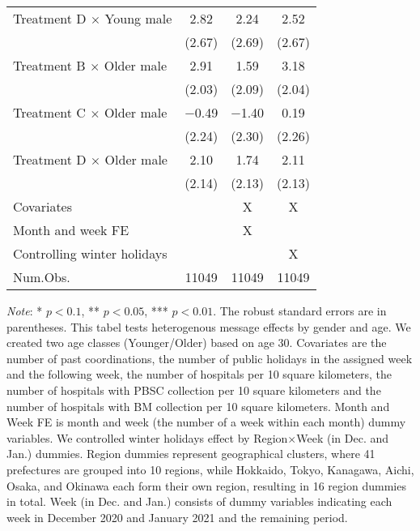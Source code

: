 \documentclass[12pt, a4paper]{article}
\begin{document}
\begin{table}[H]
\begin{threeparttable}
\begin{tabular}[t]{lccc}
Treatment D $\times$ Young male & \num{2.82} & \num{2.24} & \num{2.52}\\
 & (\num{2.67}) & (\num{2.69}) & (\num{2.67})\\
Treatment B $\times$ Older male & \num{2.91} & \num{1.59} & \num{3.18}\\
 & (\num{2.03}) & (\num{2.09}) & (\num{2.04})\\
Treatment C $\times$ Older male & \num{-0.49} & \num{-1.40} & \num{0.19}\\
 & (\num{2.24}) & (\num{2.30}) & (\num{2.26})\\
Treatment D $\times$ Older male & \num{2.10} & \num{1.74} & \num{2.11}\\
 & (\num{2.14}) & (\num{2.13}) & (\num{2.13})\\
\midrule
Covariates &  & X & X\\
Month and week FE &  & X & \\
Controlling winter holidays &  &  & X\\
Num.Obs. & \num{11049} & \num{11049} & \num{11049}\\
\bottomrule
\end{tabular}
\begin{tablenotes}
\item \emph{Note}: * $p < 0.1$, ** $p < 0.05$, *** $p < 0.01$. The robust standard errors are in parentheses. This tabel tests heterogenous message effects by gender and age. We created two age classes (Younger/Older) based on age 30. Covariates are the number of past coordinations, the number of public holidays in the assigned week and the following week, the number of hospitals per 10 square kilometers, the number of hospitals with PBSC collection per 10 square kilometers and the number of hospitals with BM collection per 10 square kilometers. Month and Week FE is month and week (the number of a week within each month) dummy variables. We controlled winter holidays effect by Region$\times$Week (in Dec. and Jan.) dummies. Region dummies represent geographical clusters, where 41 prefectures are grouped into 10 regions, while Hokkaido, Tokyo, Kanagawa, Aichi, Osaka, and Okinawa each form their own region, resulting in 16 region dummies in total. Week (in Dec. and Jan.) consists of dummy variables indicating each week in December 2020 and January 2021 and the remaining period.
\end{tablenotes}
\end{threeparttable}
\end{table}
\end{document}

